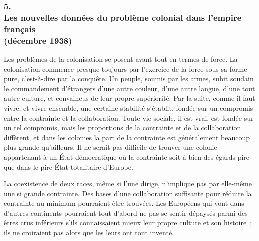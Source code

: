 \documentclass[french,twoside]{book} %
\begin{document}
\subsubsection[{5. Les nouvelles données du problème colonial dans l’empire français, (décembre 1938)}]{5. \\
Les nouvelles données du problème colonial dans l’empire français \\
(décembre 1938)}
\noindent \par
Les problèmes de la colonisation se posent avant tout en termes de force. La colonisation commence presque toujours par l'exercice de la force sous sa forme pure, c'est-à-dire par la conquête. Un peuple, soumis par les armes, subit soudain le commandement d'étrangers d'une autre couleur, d'une autre langue, d'une tout autre culture, et convaincus de leur propre supériorité. Par la suite, comme il faut vivre, et vivre ensemble, une certaine stabilité s'établit, fondée sur un compromis entre la contrainte et la collaboration. Toute vie sociale, il est vrai, est fondée sur un tel compromis, mais les proportions de la contrainte et de la collaboration diffèrent, et dans les colonies la part de la contrainte est généralement beaucoup plus grande qu'ailleurs. Il ne serait pas difficile de trouver une colonie appartenant à un État démocratique où la contrainte soit à bien des égards pire que dans le pire État totalitaire d'Europe.\par
La coexistence de deux races, même si l'une dirige, n'implique pas par elle-même une si grande contrainte. Des bases d'une collaboration suffisante pour réduire la contrainte au minimum pourraient être trouvées. Les Européens qui vont dans d'autres continents pourraient tout d'abord ne pas se sentir dépaysés parmi des êtres crus inférieurs s'ils connaissaient mieux leur propre culture et son histoire ; ils ne croiraient pas alors que les leurs ont tout inventé.\par
\end{document}
